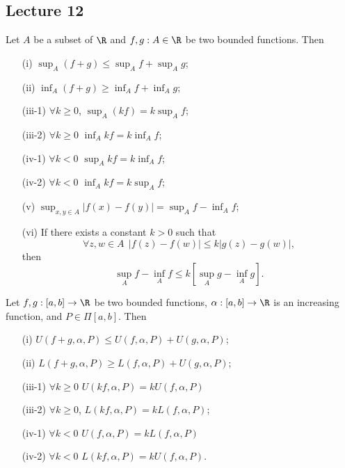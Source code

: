 \subsection{Lecture 12}

\begin{lemma}[lemma 3]\label{lemma 3}
   Let \( A  \) be a subset of \( \R  \) and \( f,g : A \in \R  \) be two bounded functions. Then 
   \begin{enumerate}
       \item[(i)] \( \sup_{A} (f+g) \leq \sup_{A} f + \sup_{A} g \);
       \item[(ii)] \( \inf_{A} (f+g) \geq \inf_{A} f + \inf_{A} g  \);
       \item[(iii-1)] \( \forall k \geq 0  \), \( \sup_{A} (kf) = k \sup_{A} f \);
       \item[(iii-2)] \(  \forall k \geq 0  \) \( \inf_{A} kf = k \inf_{A} f \);
       \item[(iv-1)] \( \forall k < 0  \) \( \sup_{A} kf = k \inf_{A} f \); 
       \item[(iv-2)] \( \forall k < 0  \) \( \inf_{A} kf = k \sup_{A} f \);
       \item[(v)] \( \sup_{x,y \in A}| f(x) - f(y) | = \sup_{A} f - \inf_{A} f \);
        \item[(vi)] If there exists a constant \( k > 0  \) such that 
            \[  \forall z,w \in A \ \ | f(z) - f(w)  | \leq k | g(z) - g(w) |,  \]
            then
            \[  \sup_{A} f - \inf_{A} f \leq k [\sup_{A} g - \inf_{A}  g].  \]
   \end{enumerate}  
\end{lemma}

\begin{lemma}[lemma 4]\label{lemma 4}
    Let \( f,g: [a,b] \to \R  \) be two bounded functions, \( \alpha: [a,b] \to \R  \) is an increasing function, and \( P \in \Pi[a,b] \). Then
    \begin{enumerate}
        \item[(i)] \( U(f + g,\alpha, P) \leq U(f,\alpha,P) + U(g,\alpha,P) \);
        \item[(ii)] \( L(f+g, \alpha, P) \geq L(f,\alpha,P) + U(g,\alpha, P) \);
        \item[(iii-1)] \( \forall k \geq 0  \) \( U(kf, \alpha, P) = k U(f,\alpha,P) \)
        \item[(iii-2)] \( \forall k \geq 0  \), \( L(kf,\alpha,P) = k L(f,\alpha,P) \);
        \item[(iv-1)] \( \forall k < 0  \) \( U(f,\alpha,P) = k L(f,\alpha,P) \)
        \item[(iv-2)] \( \forall k < 0  \) \( L(kf,\alpha, P) = k U(f,\alpha,P) \).
    \end{enumerate}
\end{lemma}

